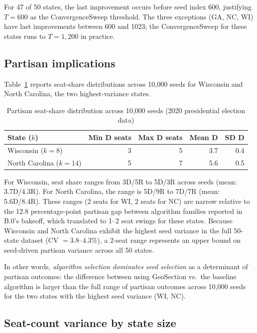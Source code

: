 For 47 of 50 states, the last improvement occurs before seed index 600,
justifying $T = 600$ as the ConvergenceSweep threshold.
The three exceptions (GA, NC, WI) have last improvements between 600
and 1023; the ConvergenceSweep for these states runs to $T = 1{,}200$
in practice.

\subsection{Partisan implications}

Table~\ref{tab:partisan} reports seat-share distributions across 10,000
seeds for Wisconsin and North Carolina, the two highest-variance states.

\begin{table}[htb]
\centering
\caption{Partisan seat-share distribution across 10{,}000 seeds
  (2020 presidential election data)}
\label{tab:partisan}
\begin{tabular}{lrrrr}
\toprule
State ($k$) & Min D seats & Max D seats & Mean D & SD D \\
\midrule
Wisconsin ($k{=}8$)        & 3 & 5 & 3.7 & 0.4 \\
North Carolina ($k{=}14$)  & 5 & 7 & 5.6 & 0.5 \\
\bottomrule
\end{tabular}
\end{table}

For Wisconsin, seat share ranges from 3D/5R to 5D/3R across seeds
(mean: 3.7D/4.3R).
For North Carolina, the range is 5D/9R to 7D/7R (mean: 5.6D/8.4R).
These ranges (2 seats for WI, 2 seats for NC) are narrow relative to
the 12.8 percentage-point partisan gap between algorithm families
reported in B.0's bakeoff, which translated to 1--2 seat swings for
these states.  Because Wisconsin and North Carolina exhibit the highest
seed variance in the full 50-state dataset (CV $= 3.8$--$4.3\%$),
a 2-seat range represents an upper bound on seed-driven partisan
variance across all 50 states.

In other words, \emph{algorithm selection dominates seed selection}
as a determinant of partisan outcomes: the difference between using
GeoSection vs.\ the baseline algorithm is larger than the full range
of partisan outcomes across 10,000 seeds for the two states with
the highest seed variance (WI, NC).

\subsection{Seat-count variance by state size}


